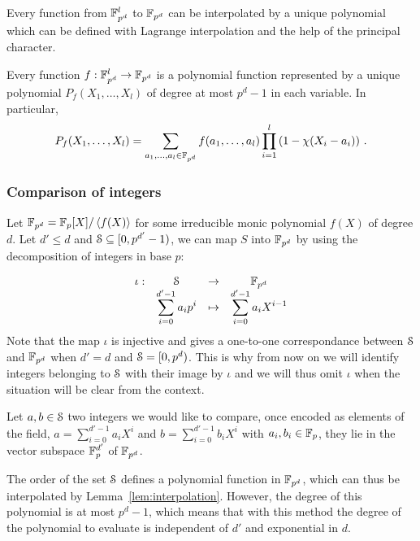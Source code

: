 Every function from $\F_{p^d}^l$ to $\F_{p^d}$ can be interpolated by a unique polynomial which can be defined with Lagrange interpolation and the help of the principal character. 
\begin{lemma}\label{lem:interpolation}
  Every function $f: \F_{p^d}^l \rightarrow \F_{p^d}$ is a polynomial function represented by a unique polynomial $P_f(X_1,\dots,X_{l})$ of degree at most $p^d - 1$ in each variable.
  In particular,
  \begin{align*}
    P_f(X_1,\dots,X_{l}) = \sum_{a_1,\dots,a_l \in \F_{p^d}} f(a_1,\dots,a_l) \prod_{i=1}^{l} \left(1 - \princhar(X_i - a_i)\right)\,.
  \end{align*}
\end{lemma}

\subsubsection{Comparison of integers}
Let $\F_{p^d} = \F_p[X]/\ideal{f(X)}$ for some irreducible monic polynomial $f(X)$ of degree $d$.
Let $d'\leq d$ and $\S \subseteq [0,p^{d'}-1)$, we can map $S$ into $\F_{p^d}$ by using the decomposition of integers in base $p$:

$$\begin{array}{cccc}
    \iota : & \S & \rightarrow & \F_{p^d} \\
            & \displaystyle\sum_{i=0}^{d'-1}a_ip^i & \mapsto & \displaystyle\sum_{i=0}^{d'-1}a_i X^{i-1} 
  \end{array}$$
Note that the map $\iota$ is injective and gives a one-to-one correspondance between $\S$ and $\F_{p^{d}}$ when $d'=d$ and $\S = [0,p^d)$. This is why from now on we will identify integers belonging to $\S$ with their image by $\iota$ and we will thus omit $\iota$ when the situation will be clear from the context.

Let $a,b\in\S$ two integers we would like to compare, once encoded as elements of the field, $a = \sum_{i=0}^{d'-1} a_i X^i$ and $b = \sum_{i=0}^{d'-1} b_i X^i$ with $a_i, b_i \in \F_p$, they lie in the vector subspace $\F_{p}^{d'}$ of $\F_{p^d}$.

The order of the set $\S$ defines a polynomial function in $\F_{p^d}$, which can thus be interpolated by Lemma~\ref{lem:interpolation}.
  However, the degree of this polynomial is at most $p^d-1$, which means that with this method the degree of the polynomial to evaluate is independent of $d'$ and exponential in $d$.

